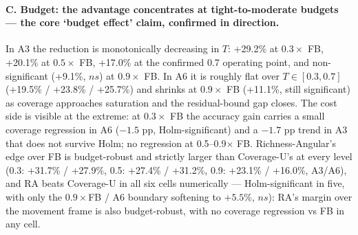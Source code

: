 \documentclass[journal]{IEEEtran}
\newcommand{\CU}{Coverage-U}
\newcommand{\RA}{Richness-Angular}
\begin{document}
\paragraph{C. Budget: the advantage concentrates at tight-to-moderate budgets
--- the core `budget effect' claim, confirmed in direction.}
In A3 the reduction is monotonically decreasing in $T$: +29.2\% at $0.3\times$
FB, +20.1\% at $0.5\times$ FB, +17.0\% at the confirmed 0.7 operating point,
and non-significant (+9.1\%, $ns$) at $0.9\times$ FB. In A6 it is roughly flat
over $T \in [0.3, 0.7]$ (+19.5\% / +23.8\% / +25.7\%) and shrinks at
$0.9\times$ FB (+11.1\%, still significant) as coverage approaches saturation
and the residual-bound gap closes. The cost side is visible at the extreme: at
$0.3\times$ FB the accuracy gain carries a small coverage regression in A6
($-1.5$ pp, Holm-significant) and a $-1.7$ pp trend in A3 that does not survive
Holm; no regression at 0.5--0.9$\times$ FB. \RA's{} edge over FB is
budget-robust and strictly larger than \CU's{} at every level (0.3: +31.7\% /
+27.9\%, 0.5: +27.4\% / +31.2\%, 0.9: +23.1\% / +16.0\%, A3/A6), and RA beats
\CU{} in all six cells numerically --- Holm-significant in five, with only the
$0.9\times$FB / A6 boundary softening to
$+5.5\%$, $ns$): RA's margin over the movement frame is also budget-robust,
with no coverage regression vs FB in any cell.
\end{document}
